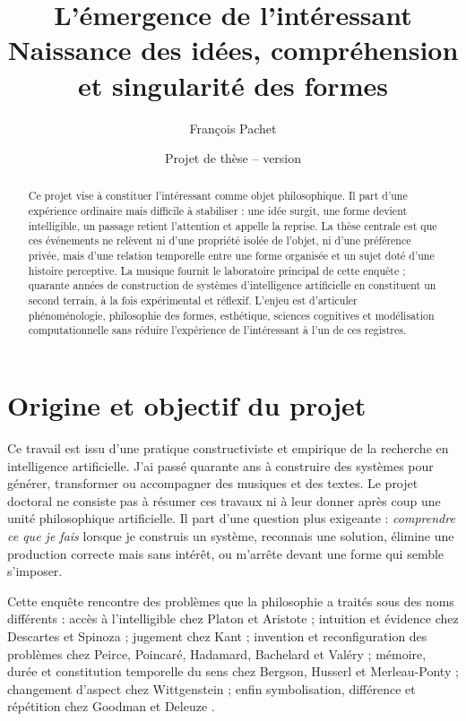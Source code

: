 \documentclass[11pt,a4paper]{article}
\title{L'émergence de l'intéressant\\
\large Naissance des idées, compréhension et singularité des formes}
\author{François Pachet}
\date{Projet de thèse -- version \projectversion\\\small \projectdate}
\begin{document}
\maketitle

\begin{abstract}
Ce projet vise à constituer l'intéressant comme objet philosophique. Il part
d'une expérience ordinaire mais difficile à stabiliser : une idée surgit, une
forme devient intelligible, un passage retient l'attention et appelle la reprise.
La thèse centrale est que ces événements ne relèvent ni d'une propriété isolée
de l'objet, ni d'une préférence privée, mais d'une relation temporelle entre une
forme organisée et un sujet doté d'une histoire perceptive. La musique fournit
le laboratoire principal de cette enquête ; quarante années de construction de
systèmes d'intelligence artificielle en constituent un second terrain, à la fois
expérimental et réflexif. L'enjeu est d'articuler phénoménologie, philosophie des
formes, esthétique, sciences cognitives et modélisation computationnelle sans
réduire l'expérience de l'intéressant à l'un de ces registres.
\end{abstract}

\section{Origine et objectif du projet}

Ce travail est issu d'une pratique constructiviste et empirique de la recherche
en intelligence artificielle. J'ai passé quarante ans à construire des systèmes
pour générer, transformer ou accompagner des musiques et des textes. Le projet
doctoral ne consiste pas à résumer ces travaux ni à leur donner après coup une
unité philosophique artificielle. Il part d'une question plus exigeante :
\emph{comprendre ce que je fais} lorsque je construis un système, reconnais une
solution, élimine une production correcte mais sans intérêt, ou m'arrête devant
une forme qui semble s'imposer.

Cette enquête rencontre des problèmes que la philosophie a traités sous des noms
différents : accès à l'intelligible chez Platon et Aristote
\parencite{platon2016republique,platon1995theetete,aristote1991metaphysique,aristote2005seconds};
intuition et évidence chez Descartes et Spinoza
\parencite{descartes2002regles,descartes1992meditations,spinoza1966ethique};
jugement chez Kant \parencite{kant2001raison,kant1993juger}; invention et
reconfiguration des problèmes chez Peirce, Poincaré, Hadamard, Bachelard et
Valéry \parencite{peirce1955writings,poincare1908science,hadamard1959invention,bachelard1999formation,valery1973cahiers};
mémoire, durée et constitution temporelle du sens chez Bergson, Husserl et
Merleau-Ponty
\parencite{bergson2013evolution,bergson2013pensee,husserl1970experience,husserl1957logique,merleau1945phenomenologie};
changement d'aspect chez Wittgenstein \parencite{wittgenstein2004recherches};
enfin symbolisation, différence et répétition chez Goodman et Deleuze
\parencite{goodman1976languages,deleuze1968difference}.
\end{document}
